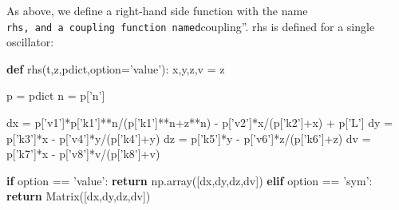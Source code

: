 \documentclass[english,a4paper,oneside]{article}
\newenvironment{Shaded}{}{}
\newcommand{\ControlFlowTok}[1]{\textcolor[rgb]{0.00,0.44,0.13}{\textbf{#1}}}
\newcommand{\KeywordTok}[1]{\textcolor[rgb]{0.00,0.44,0.13}{\textbf{#1}}}
\newcommand{\NormalTok}[1]{#1}
\newcommand{\OperatorTok}[1]{\textcolor[rgb]{0.40,0.40,0.40}{#1}}
\newcommand{\StringTok}[1]{\textcolor[rgb]{0.25,0.44,0.63}{#1}}
\begin{document}
As above, we define a right-hand side function with the name
\texttt{rhs\textquotesingle{}\textquotesingle{},\ and\ a\ coupling\ function\ named}coupling''.
rhs is defined for a single oscillator:

\begin{Shaded}
\begin{Highlighting}[]
\KeywordTok{def}\NormalTok{ rhs(t,z,pdict,option}\OperatorTok{=}\StringTok{'value'}\NormalTok{):}
\NormalTok{    x,y,z,v }\OperatorTok{=}\NormalTok{ z}
    
\NormalTok{    p }\OperatorTok{=}\NormalTok{ pdict}
\NormalTok{    n }\OperatorTok{=}\NormalTok{ p[}\StringTok{'n'}\NormalTok{]}
    
\NormalTok{    dx }\OperatorTok{=}\NormalTok{ p[}\StringTok{'v1'}\NormalTok{]}\OperatorTok{*}\NormalTok{p[}\StringTok{'k1'}\NormalTok{]}\OperatorTok{**}\NormalTok{n}\OperatorTok{/}\NormalTok{(p[}\StringTok{'k1'}\NormalTok{]}\OperatorTok{**}\NormalTok{n}\OperatorTok{+}\NormalTok{z}\OperatorTok{**}\NormalTok{n) }\OperatorTok{-}\NormalTok{ p[}\StringTok{'v2'}\NormalTok{]}\OperatorTok{*}\NormalTok{x}\OperatorTok{/}\NormalTok{(p[}\StringTok{'k2'}\NormalTok{]}\OperatorTok{+}\NormalTok{x) }\OperatorTok{+}\NormalTok{ p[}\StringTok{'L'}\NormalTok{]}
\NormalTok{    dy }\OperatorTok{=}\NormalTok{ p[}\StringTok{'k3'}\NormalTok{]}\OperatorTok{*}\NormalTok{x }\OperatorTok{-}\NormalTok{ p[}\StringTok{'v4'}\NormalTok{]}\OperatorTok{*}\NormalTok{y}\OperatorTok{/}\NormalTok{(p[}\StringTok{'k4'}\NormalTok{]}\OperatorTok{+}\NormalTok{y)}
\NormalTok{    dz }\OperatorTok{=}\NormalTok{ p[}\StringTok{'k5'}\NormalTok{]}\OperatorTok{*}\NormalTok{y }\OperatorTok{-}\NormalTok{ p[}\StringTok{'v6'}\NormalTok{]}\OperatorTok{*}\NormalTok{z}\OperatorTok{/}\NormalTok{(p[}\StringTok{'k6'}\NormalTok{]}\OperatorTok{+}\NormalTok{z)}
\NormalTok{    dv }\OperatorTok{=}\NormalTok{ p[}\StringTok{'k7'}\NormalTok{]}\OperatorTok{*}\NormalTok{x }\OperatorTok{-}\NormalTok{ p[}\StringTok{'v8'}\NormalTok{]}\OperatorTok{*}\NormalTok{v}\OperatorTok{/}\NormalTok{(p[}\StringTok{'k8'}\NormalTok{]}\OperatorTok{+}\NormalTok{v)}
    
    \ControlFlowTok{if}\NormalTok{ option }\OperatorTok{==} \StringTok{'value'}\NormalTok{:}
        \ControlFlowTok{return}\NormalTok{ np.array([dx,dy,dz,dv])}
    \ControlFlowTok{elif}\NormalTok{ option }\OperatorTok{==} \StringTok{'sym'}\NormalTok{:}
        \ControlFlowTok{return}\NormalTok{ Matrix([dx,dy,dz,dv])}
\end{Highlighting}
\end{Shaded}
\end{document}
